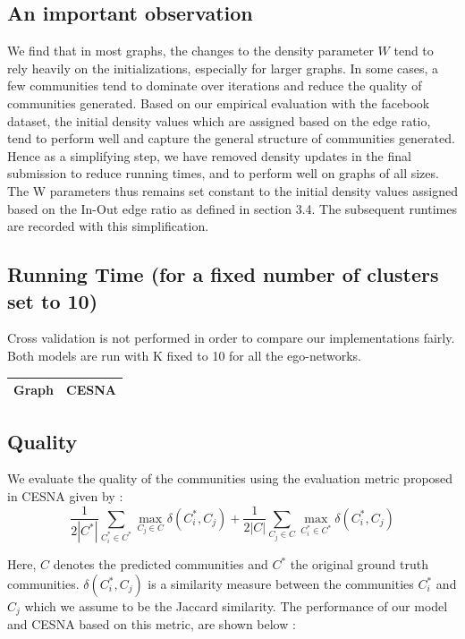\documentclass[11pt]{article}
\begin{document}
\subsection{An important observation}
We find that in most graphs, the changes to the density parameter $W$ tend to rely heavily on the initializations, especially for larger graphs. In some cases, a few communities tend to dominate over iterations and reduce the quality of communities generated. Based on our empirical evaluation with the facebook dataset, the initial density values which are assigned based on the edge ratio, tend to perform well and capture the general structure of communities generated. Hence as a simplifying step, we have removed density updates in the final submission to reduce running times, and to perform well on graphs of all sizes. The W parameters thus remains set constant to the initial density values assigned based on the In-Out edge ratio as defined in section 3.4. The subsequent runtimes are recorded with this simplification.
\subsection{Running Time (for a fixed number of clusters set to 10)}
Cross validation is not performed in order to compare our implementations fairly. Both models are run with K fixed to 10 for all the ego-networks.
\begin{tabular}{|c|c|}
\hline
\textbf{Graph} & \textbf{CESNA} \\ \hline
\end{tabular}
\subsection{Quality}
We evaluate the quality of the communities using the evaluation metric proposed in CESNA given by : 
\[ \frac{1}{2 |C^{*}|} \sum\limits_{C_i^{*} \in C^{*}} \max_{C_j \in C} \delta (C_i^{*}, C_j) + \frac{1}{2 |C|} \sum\limits_{C_j \in C} \max_{C_i^{*} \in C^{*}} \delta (C_i^{*}, C_j) \]

Here, $C$ denotes the  predicted communities and $C^{*}$ the original ground truth communities. $\delta(C_i^{*}, C_j)$ is a similarity measure between the communities $C_i^{*}$ and $C_j$ which we assume to be the Jaccard similarity. The performance of our model and CESNA based on this metric, are shown below :
\end{document}
